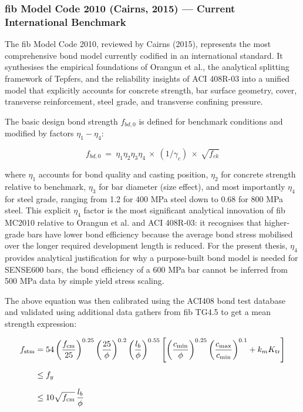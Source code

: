 \subsubsection{fib Model Code 2010 (Cairns, 2015) — Current International Benchmark}
The fib Model Code 2010, reviewed by Cairns (2015), represents the most comprehensive bond model currently codified in an international standard. It synthesises the empirical foundations of Orangun et al., the analytical splitting framework of Tepfers, and the reliability insights of ACI 408R-03 into a unified model that explicitly accounts for concrete strength, bar surface geometry, cover, transverse reinforcement, steel grade, and transverse confining pressure.

The basic design bond strength $f_{bd,0}$ is defined for benchmark conditions and modified by factors $\eta_1-\eta_4$:

\begin{equation}
    f_{bd,0}\ =\ {\eta }_{1}{\eta }_{2}{\eta }_{3}{\eta }_{4}\ \times \ (1/{\gamma }_{c})\ \times \ \sqrt{f_{ck}}
\end{equation}

where ${\eta }_{1}$ accounts for bond quality and casting position, ${\eta }_{2}$ for concrete strength relative to benchmark, ${\eta }_{3}$ for bar diameter (size effect), and most importantly ${\eta }_{4}$ for steel grade, ranging from 1.2 for 400 MPa steel down to 0.68 for 800 MPa steel. This explicit ${\eta }_{4}$ factor is the most significant analytical innovation of fib MC2010 relative to Orangun et al. and ACI 408R-03: it recognises that higher-grade bars have lower bond efficiency because the average bond stress mobilised over the longer required development length is reduced. For the present thesis, ${\eta }_{4}$ provides analytical justification for why a purpose-built bond model is needed for SENSE600 bars, the bond efficiency of a 600 MPa bar cannot be inferred from 500 MPa data by simple yield stress scaling.

The above equation was then calibrated using the ACI408 bond test database and validated using additional data gathers from fib TG4.5 to get a mean strength expression:

\begin{align}
f_{\mathrm{stm}}
&= 54\left(\frac{f_{\mathrm{cm}}}{25}\right)^{0.25}
     \left(\frac{25}{\phi}\right)^{0.2}
     \left(\frac{l_b}{\phi}\right)^{0.55}
     \left[
       \left(\frac{c_{\mathrm{min}}}{\phi}\right)^{0.25}
       \left(\frac{c_{\mathrm{max}}}{c_{\mathrm{min}}}\right)^{0.1}
       + k_m K_{\mathrm{tr}}
     \right] \label{eq:fstm} \\[6pt]
&\leq f_y \notag \\[6pt]
&\leq 10\sqrt{f_{\mathrm{cm}}}\,\frac{l_b}{\phi} \notag
\end{align}

